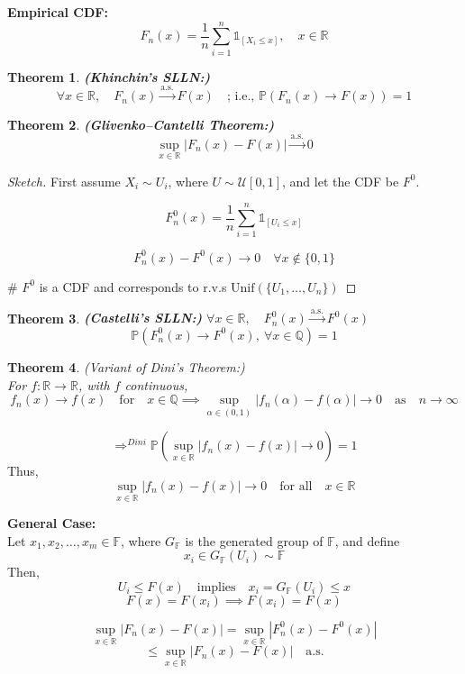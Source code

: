 \documentclass{article}
\newcommand{\1}{\mathds{1}}
\newtheorem{theorem}{Theorem}[section]
\begin{document}
\noindent\textbf{Empirical CDF:}
\[
F_n(x) = \frac{1}{n} \sum_{i=1}^n \1_{[X_i \leq x]}, \quad x \in \mathbb{R}
\]
\begin{theorem}\textbf{(Khinchin’s SLLN:)}
\[
\forall x \in \mathbb{R}, \quad F_n(x) \xrightarrow{\text{a.s.}} F(x)
\quad \text{; i.e., } \mathbb{P}\left( F_n(x) \to F(x) \right) = 1
\]
\end{theorem}
\begin{theorem}\textbf{(Glivenko–Cantelli Theorem:)}
\[
\sup_{x \in \mathbb{R}} |F_n(x) - F(x)| \xrightarrow{\text{a.s.}} 0
\]
\end{theorem}
\begin{proof}[Sketch] First assume \( X_i \sim U_i \), where \( U \sim \mathcal{U}[0,1] \), and let the CDF be \( F^0 \).

\[
F_n^0(x) = \frac{1}{n} \sum_{i=1}^n \1_{[U_i \leq x]}
\]

\[
F_n^0(x) - F^0(x) \to 0 \quad \forall x \not\in \{0,1\}
\]

\# \( F^0 \) is a CDF and corresponds to r.v.s \( \text{Unif}(\{U_1, \ldots, U_n\}) \)
\end{proof}
\begin{theorem}\textbf{(Castelli's SLLN:)} \( \forall x \in \mathbb{R}, \quad F_n^0(x) \xrightarrow{\text{a.s.}} F^0(x) \)
\[
\mathbb{P}\left( F_n^0(x) \to F^0(x), \ \forall x \in \mathbb{Q} \right) = 1
\]
\end{theorem}
\begin{theorem}{(Variant of Dini's Theorem:)} \\
For \( f: \mathbb{R} \to \mathbb{R} \), with \( f \) continuous, 
\[
f_n(x) \to f(x) \quad \text{for} \quad x \in \mathbb{Q} \implies \sup_{\alpha \in (0,1)} |f_n(\alpha) - f(\alpha)| \to 0 \quad \text{as} \quad n \to \infty
\]
\end{theorem}
\[
\Rightarrow^{Dini} \mathbb{P}\left( \sup_{x \in \mathbb{R}} |f_n(x) - f(x)| \to 0 \right) = 1
\]
Thus,
\[
\sup_{x \in \mathbb{R}} |f_n(x) - f(x)| \to 0 \quad \text{for all} \quad x \in \mathbb{R}
\]

\noindent\textbf{General Case:} \\
Let \( x_1, x_2, \dots, x_m \in \mathbb{F} \), where \( G_{\mathbb{F}} \) is the generated group of \( \mathbb{F} \), and define
\[
x_i \in G_{\mathbb{F}}(U_i) \sim \mathbb{F}
\]
Then,
\[
U_i \leq F(x) \quad \text{implies} \quad x_i = G_{\mathbb{F}}(U_i) \leq x
\]
\[
F(x) = F(x_i) \implies F(x_i) = F(x)
\]

\[
\sup_{x \in \mathbb{R}} |F_n(x) - F(x)| = \sup_{x \in \mathbb{R}} |F_n^0(x) - F^0(x)|
\]
\[
\leq \sup_{x \in \mathbb{R}} |F_n(x) - F(x)| \quad \text{a.s.}
\]
\end{document}
